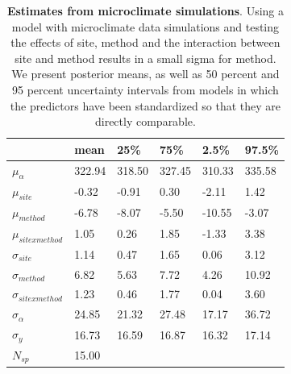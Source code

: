 \documentclass{article}\usepackage[]{graphicx}\usepackage[]{color}
\begin{document}
\begin{table}[ht]
\centering
\caption{\textbf{Estimates from microclimate simulations}. Using a model with microclimate data simulations and testing the effects of site, method and the interaction between site and method results in a small sigma for method. We present posterior means, as well as 50 percent and 95 percent uncertainty intervals from models in which the predictors have been standardized so that they are directly comparable.} 
\label{tab:micros}
\begingroup\footnotesize
\begin{tabular}{|p{}|p{}p{}p{}p{}p{}|}
  \hline
 & mean & 25\% & 75\% & 2.5\% & 97.5\% \\ 
  \hline
$\mu_{\alpha}$ & 322.94 & 318.50 & 327.45 & 310.33 & 335.58 \\ 
  $\mu_{site}$ & -0.32 & -0.91 & 0.30 & -2.11 & 1.42 \\ 
  $\mu_{method}$ & -6.78 & -8.07 & -5.50 & -10.55 & -3.07 \\ 
  $\mu_{sitexmethod}$ & 1.05 & 0.26 & 1.85 & -1.33 & 3.38 \\ 
  $\sigma_{site}$ & 1.14 & 0.47 & 1.65 & 0.06 & 3.12 \\ 
  $\sigma_{method}$ & 6.82 & 5.63 & 7.72 & 4.26 & 10.92 \\ 
  $\sigma_{sitexmethod}$ & 1.23 & 0.46 & 1.77 & 0.04 & 3.60 \\ 
  $\sigma_{\alpha}$ & 24.85 & 21.32 & 27.48 & 17.17 & 36.72 \\ 
  $\sigma_{y}$ & 16.73 & 16.59 & 16.87 & 16.32 & 17.14 \\ 
   \hline
$N_{sp}$ & 15.00 &  &  &  &  \\ 
   \hline
\end{tabular}
\endgroup
\end{table}
\end{document}
